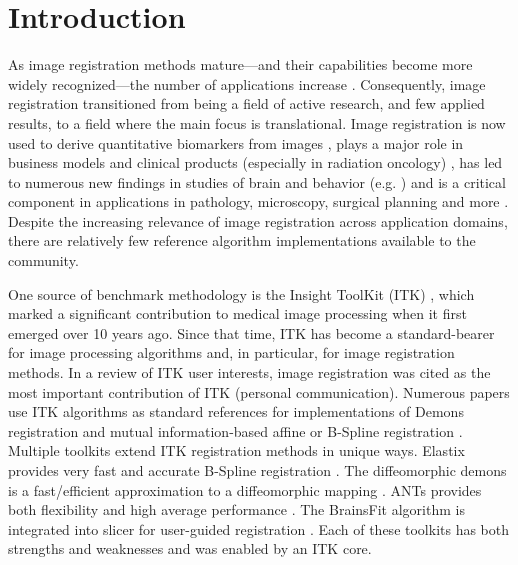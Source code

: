 \documentclass{llncs}
\begin{document}
\section{Introduction}
As image registration methods mature---and their capabilities become
more widely recognized---the number of applications increase
\cite{Rueckert1999,2004,Shelton2005,Miller2005,Chen2008,Cheung2009,Baloch2009,Peyrat2010,Metz2011,Kikinis2011,Fedorov2011,Murphy2011}.
Consequently, image registration transitioned from being a field of active research, and few applied results, to a
field where the main focus is translational.  Image registration is
now used to derive quantitative biomarkers from images
\cite{Jack2010a}, plays a major role in business models and clinical
products (especially in radiation oncology) \cite{Cheung2009}, has led
to numerous new findings in studies of brain and behavior (e.g. \cite{Bearden2007}) and is a critical component in applications in
pathology, microscopy, surgical planning and more
\cite{Shelton2005,Miller2005,Floca2007,Chen2008,Cheung2009,Peyrat2010,Kikinis2011,Murphy2011}.
Despite the increasing relevance of image registration across
application domains, there are relatively few reference algorithm
implementations available to the community.






One source of benchmark methodology is the Insight ToolKit (ITK)
\cite{Yoo2002,Ackerman2003}, which marked a significant contribution to
medical image processing when it first emerged over 10 years ago.
Since that time, ITK has become a standard-bearer for image
processing algorithms and, in particular, for image registration
methods.  In a review of ITK user interests, image registration was cited as the most important
contribution of ITK (personal communication).  Numerous papers use ITK
algorithms as standard references for implementations of Demons
registration and mutual information-based affine or B-Spline
registration \cite{2004,Shelton2005,Floca2007,Chen2008,Cheung2009}.
Multiple toolkits extend ITK registration methods in unique ways.
Elastix provides very fast and accurate B-Spline registration
\cite{Klein2010,Murphy2011}.  The diffeomorphic demons is a fast/efficient
approximation to a diffeomorphic mapping \cite{Vercauteren2009}.  
ANTs provides both flexibility and high average performance
\cite{Avants2011}.  The BrainsFit algorithm is integrated into slicer
for user-guided registration \cite{Kikinis2011}.
Each of these toolkits has both strengths and weaknesses
\cite{Klein2010,Murphy2011} and was enabled by an ITK core.    
\end{document}
